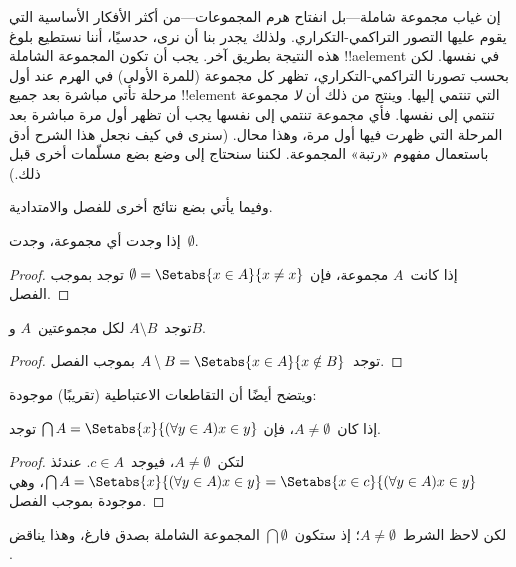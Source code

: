 \documentclass[../../../include/open-logic-section]{subfiles}
\begin{document}
  إن غياب مجموعة شاملة---بل انفتاح هرم المجموعات---من أكثر الأفكار
  الأساسية التي يقوم عليها التصور التراكمي-التكراري. ولذلك يجدر بنا أن نرى، حدسيًا،
أننا نستطيع بلوغ هذه النتيجة بطريق آخر. يجب أن تكون المجموعة الشاملة
!!a{element} في نفسها. لكن بحسب تصورنا التراكمي-التكراري، تظهر كل
مجموعة (للمرة الأولى) في الهرم عند أول مرحلة تأتي مباشرة بعد جميع
!!{element} التي تنتمي إليها. وينتج من ذلك أن \emph{لا} مجموعة تنتمي
إلى نفسها. فأي مجموعة تنتمي إلى نفسها يجب أن تظهر أول مرة مباشرة بعد
المرحلة التي ظهرت فيها أول مرة، وهذا محال. (سنرى في
 كيف نجعل هذا الشرح أدق باستعمال
مفهوم «رتبة» المجموعة. لكننا سنحتاج إلى وضع بضع مسلّمات أخرى قبل ذلك.)

وفيما يأتي بضع نتائج أخرى للفصل والامتدادية.

\begin{prop}
إذا وجدت أي مجموعة، وجدت~$\emptyset$.
\end{prop}

\begin{proof}
إذا كانت~$A$ مجموعة، فإن
$\emptyset = \Setabs{x \in A}{x \neq x}$ توجد بموجب الفصل.
\end{proof}

\begin{prop}
توجد~$A \setminus B$ لكل مجموعتين~$A$ و$B$.
\end{prop}

\begin{proof}
توجد~$A \setminus B = \Setabs{x \in A}{x \notin B}$ بموجب الفصل.
\end{proof}

ويتضح أيضًا أن التقاطعات الاعتباطية (تقريبًا) موجودة:

\begin{prop}
إذا كان~$A \neq \emptyset$، فإن
$\bigcap A = \Setabs{x}{(\forall y \in A)x \in y}$ توجد.
\end{prop}

\begin{proof}
لتكن~$A \neq \emptyset$، فيوجد~$c \in A$. عندئذ
$\bigcap A = \Setabs{x}{(\forall y \in A)x \in y} =
\Setabs{x \in c}{(\forall y \in A)x \in y}$، وهي موجودة بموجب الفصل.
\end{proof}

لكن لاحظ الشرط~$A \neq \emptyset$؛ إذ ستكون~$\bigcap \emptyset$
المجموعة الشاملة بصدق فارغ، وهذا يناقض
.
\end{document}
